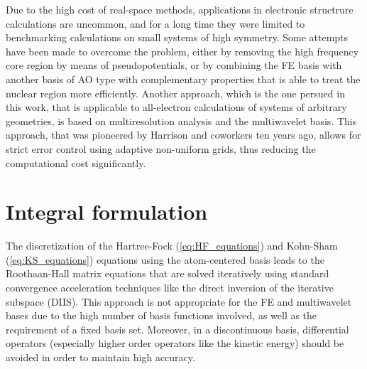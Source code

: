 Due to the high cost of real-space methods, applications in electronic structrure 
calculations are uncommon, and for a long time they were limited to benchmarking 
calculations on small systems of high 
symmetry\cite{Laaksonen:1983-1,Laaksonen:1983-2,Laaksonen:1983-3,Kobus:1996}. 
Some attempts have been made to overcome the problem, either by removing the high 
frequency core region by means of pseudopotentials, or by combining the FE basis 
with another basis of AO type with complementary properties that is able to treat 
the nuclear region more 
efficiently\cite{Kurashige:2007,Watson:2008,Kurashige:2010,Losilla:2012}. Another 
approach, which is the one persued in this work, that is applicable to all-electron 
calculations of systems of arbitrary geometries, is based on multiresolution analysis 
and the multiwavelet basis. This approach, that was pioneered by Harrison and 
coworkers\cite{Harrison_basic:2004,Yanai_HF:2004,Yanai_anal:2004,Yanai_TDDFT:2005} 
ten years ago, allows for strict error control 
using adaptive non-uniform grids, thus reducing the computational cost significantly.

\section{Integral formulation}
The discretization of the Hartree-Fock (\ref{eq:HF_equations}) and Kohn-Sham (\ref{eq:KS_equations})
equations using the atom-centered basis leads to the Roothaan-Hall\cite{Roothaan:1951,Hall:1951} 
matrix 
equations that are solved iteratively using standard convergence acceleration techniques like
the direct inversion of the iterative subspace (DIIS)\cite{Pulay:1980}. This approach is not 
appropriate for the FE and multiwavelet bases due to the high number of basis functions involved,
as well as the requirement of a fixed basis set. Moreover,
in a discontinuous basis, differential operators (especially higher order operators like
the kinetic energy) should be avoided in order to maintain high accuracy\cite{Harrison_basic:2004}.

